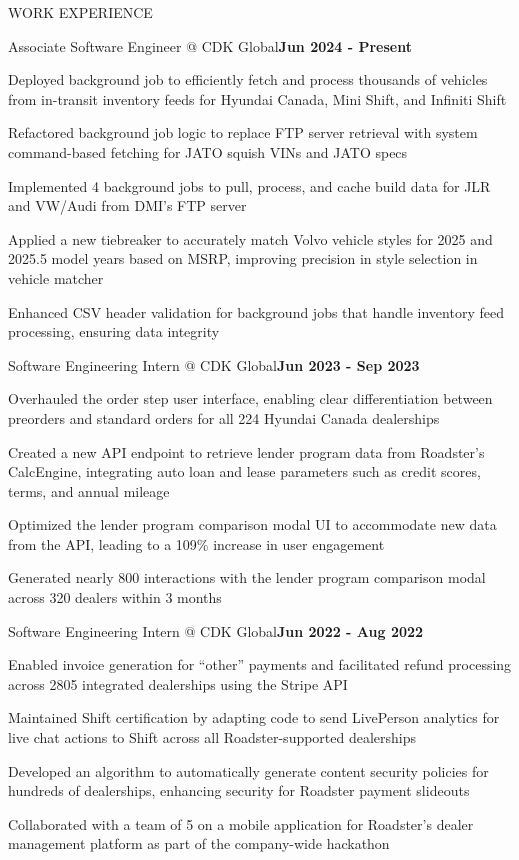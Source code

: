 \documentclass[]{resume}
\begin{document}
\begin{section}{WORK EXPERIENCE}
    \begin{subsection}{Associate Software Engineer @ CDK Global}{}{\textbf{Jun 2024 - Present}}{}
        \item Deployed background job to efficiently fetch and process thousands of vehicles from in-transit inventory feeds for Hyundai Canada, Mini Shift, and Infiniti Shift
        \item Refactored background job logic to replace FTP server retrieval with system command-based fetching for JATO squish VINs and JATO specs
        \item Implemented 4 background jobs to pull, process, and cache build data for JLR and VW/Audi from DMI's FTP server
        \item Applied a new tiebreaker to accurately match Volvo vehicle styles for 2025 and 2025.5 model years based on MSRP, improving precision in style selection in vehicle matcher
        \item Enhanced CSV header validation for background jobs that handle inventory feed processing, ensuring data integrity
    \end{subsection}
    \begin{subsection}{Software Engineering Intern @ CDK Global}{}{\textbf{Jun 2023 - Sep 2023}}{}
        \item Overhauled the order step user interface, enabling clear differentiation between preorders and standard orders for all 224 Hyundai Canada dealerships
        \item Created a new API endpoint to retrieve lender program data from Roadster's CalcEngine, integrating auto loan and lease parameters such as credit scores, terms, and annual mileage
        \item Optimized the lender program comparison modal UI to accommodate new data from the API, leading to a 109\% increase in user engagement
        \item Generated nearly 800 interactions with the lender program comparison modal across 320 dealers within 3 months
    \end{subsection}
    
    \begin{subsection}{Software Engineering Intern @ CDK Global}{}{\textbf{Jun 2022 - Aug 2022}}{}
        \item Enabled invoice generation for “other” payments and facilitated refund processing across 2805 integrated dealerships using the Stripe API
        \item Maintained Shift certification by adapting code to send LivePerson analytics for live chat actions to Shift across all Roadster-supported dealerships
        \item Developed an algorithm to automatically generate content security policies for hundreds of dealerships, enhancing security for Roadster payment slideouts
        \item Collaborated with a team of 5 on a mobile application for Roadster’s dealer management platform as part of the company-wide hackathon
    \end{subsection}
\end{section}
\end{document}
